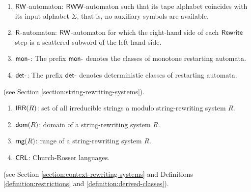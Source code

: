 \begin{enumerate}[]
\item $\textup{\sf RW}$-automaton: $\textup{\sf RWW}$-automaton such that its tape alphabet coincides with its input alphabet $\Sigma$, that is, no auxiliary symbols are available.
\item $\textup{\sf R}$-automaton: $\textup{\sf RW}$-automaton for which the right-hand side of each $\textup{\sf Rewrite}$ step is a scattered subword of the left-hand side.
\item $\textup{\sf mon-}$: The prefix $\textup{\sf mon-}$ denotes the classes of monotone restarting automata.
\item $\textup{\sf det-}$: The prefix $\textup{\sf det-}$ denotes deterministic classes of restarting automata.
\end{enumerate}

 (see Section \ref{section:string-rewriting-systems}).

\begin{enumerate}[]
\item $\textup{\sf IRR}(R)$: set of all irreducible strings a modulo string-rewriting system $R$.
\item $\textup{\sf dom}(R)$: domain of a string-rewriting system $R$.
\item $\textup{\sf rng}(R)$: range of a string-rewriting system $R$.
\item $\textup{\sf CRL}$: Church-Rosser languages.
\end{enumerate}



 (see Section \ref{section:context-rewriting-systems} and Definitions \ref{definition:restrictions} and \ref{definition:derived-classes}).

